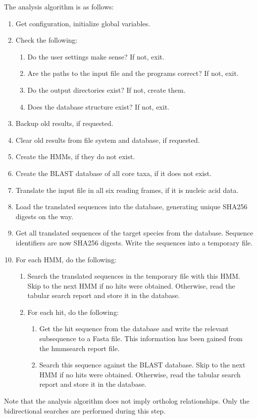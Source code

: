 The analysis algorithm is as follows:

\begin{enumerate}
	\item Get configuration, initialize global variables.
	\item Check the following:
	\begin{enumerate}
		\item Do the user settings make sense? If not, exit.
		\item Are the paths to the input file and the programs correct? If not,
			exit.
		\item Do the output directories exist? If not, create them.
		\item Does the database structure exist? If not, exit.
	\end{enumerate}
	\item Backup old results, if requested.
	\item Clear old results from file system and database, if requested.
	\item Create the HMMs, if they do not exist.
	\item Create the BLAST database of all core taxa, if it does not exist.
	\item Translate the input file in all six reading frames, if it is nucleic
		acid data.
	\item Load the translated sequences into the database, generating unique
		SHA256 digests on the way.
	\item Get all translated sequences of the target species from the database.
		Sequence identifiers are now SHA256 digests. Write the sequences into a
		temporary file.
	\item For each HMM, do the following:
	\begin{enumerate}
		\item Search the translated sequences in the temporary file with this HMM.
			Skip to the next HMM if no hits were obtained. Otherwise, read the tabular
			search report and store it in the database. 
		\item For each hit, do the following:
		\begin{enumerate}
			\item Get the hit sequence from the database and write the relevant
				subsequence to a Fasta file. This information has been gained from the
				hmmsearch report file.
			\item Search this sequence against the BLAST database. Skip to the next
				HMM if no hits were obtained. Otherwise, read the tabular search report
				and store it in the database. 
		\end{enumerate}
	\end{enumerate}
\end{enumerate}

Note that the analysis algorithm does not imply ortholog relationships. Only the
bidirectional searches are performed during this step. 
